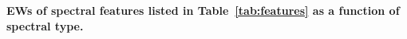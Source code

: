 {\bf EWs of spectral features listed in Table~\ref{tab:features} as a function of spectral type.\label{fig:EW-SptTyp}}